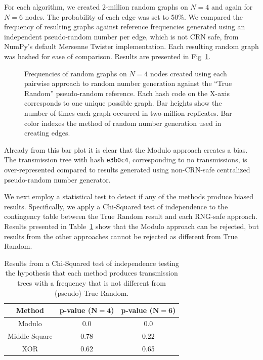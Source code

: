 \documentclass[10pt,letterpaper]{article}
\begin{document}
For each algorithm, we created 2-million random graphs on $N=4$ and again for $N=6$ nodes. The probability of each edge was set to 50\%. We compared the frequency of resulting graphs against reference frequencies generated using an independent pseudo-random number per edge, which is not CRN safe, from NumPy's default Mersenne Twister implementation. Each resulting random graph was hashed for ease of comparison. Results are presented in Fig~\ref{f:pairwise_cor}.
\begin{figure}[!b]
\centering
\caption{Frequencies of random graphs on $N=4$ nodes created using each pairwise approach to random number generation against the ``True Random'' pseudo-random reference. Each hash code on the X-axis corresponds to one unique possible graph. Bar heights show the number of times each graph occurred in two-million replicates. Bar color indexes the method of random number generation used in creating edges.}
\label{f:pairwise_cor}
\end{figure}


Already from this bar plot it is clear that the Modulo approach creates a bias. The transmission tree with hash {\tt e3b0c4}, corresponding to no transmissions, is over-represented compared to results generated using non-CRN-safe centralized pseudo-random number generator.

We next employ a statistical test to detect if any of the methods produce biased results. Specifically, we apply a Chi-Squared test of independence to the contingency table between the True Random result and each RNG-safe approach. Results presented in Table~\ref{t:pairwise_cor} show that the Modulo approach can be rejected, but results from the other approaches cannot be rejected as different from True Random.
\begin{table}[h]
    \caption{Results from a Chi-Squared test of independence testing the hypothesis that each method produces transmission trees with a frequency that is not different from (pseudo) True Random.}
    \centering
    \begin{tabular}{|c|c|c|}
    \hline
       \textbf{Method}  & \textbf{p-value} ($\mathbf{N=4}$) & \textbf{p-value} ($\mathbf{N=6}$)\\
    \hline
        Modulo&	0.0 & 0.0\\
    \hline
        Middle Square&	\textcolor{black}{0.78} & \textcolor{black}{0.22}\\
    \hline
        XOR&	\textcolor{black}{0.62} & \textcolor{black}{0.65}\\
    \hline
    \end{tabular}
    \label{t:pairwise_cor}
\end{table}
\end{document}
